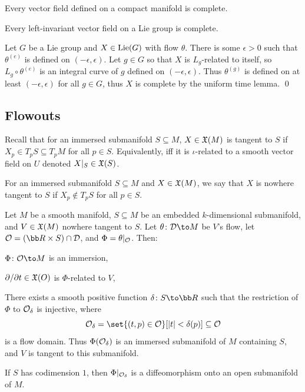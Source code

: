 \eproof

\bcoro

    Every vector field defined on a compact manifold is complete.

\ecoro

\bthrm

    Every left-invariant vector field on a Lie group is complete.

\ethrm

\bproof

    Let $G$ be a Lie group and $X\in{\rm Lie}(G)$ with flow $\theta$.
    There is some $\epsilon>0$ such that $\theta^{(e)}$ is defined on $(-\epsilon,\epsilon)$.
    Let $g\in G$ so that $X$ is $L_g$-related to itself, so $L_g\circ\theta^{(e)}$ is an integral curve of $g$ defined on $(-\epsilon,\epsilon)$.
    Thus $\theta^{(g)}$ is defined on at least $(-\epsilon,\epsilon)$ for all $g\in G$, thus $X$ is complete by the uniform time lemma.
    \qed

\eproof

\subsection{Flowouts}

Recall that for an immersed submanifold $S\subseteq M$, $X\in{\frak X}(M)$ is {\emphcolor tangent to $S$} if $X_p\in T_pS\subseteq T_pM$ for all $p\in S$.
Equivalently, iff it is $\iota$-related to a smooth vector field on $U$ denoted $X|_S\in{\frak X}(S)$.

\bdefn

    For an immersed submanifold $S\subseteq M$ and $X\in{\frak X}(M)$, we say that $X$ is {\emphcolor nowhere tangent to $S$} if
    $X_p\notin T_pS$ for all $p\in S$.

\edefn

\bthrm[title=Flowout theorem]

    Let $M$ be a smooth manifold, $S\subseteq M$ be an embedded $k$-dimensional submanifold, and $V\in{\frak X}(M)$ nowhere tangent to $S$.
    Let $\theta\colon\D\to M$ be $V$'s flow, let $\O=(\bR\times S)\cap\D$, and $\Phi=\theta|_{{\cal O}}$.
    Then:
    \benum
        \item $\Phi\colon\O\to M$ is an immersion,
        \item $\partial /\partial t\in{\frak X}(O)$ is $\Phi$-related to $V$,
        \item There exists a smooth positive function $\delta\colon S\to\bR$ such that the restriction of $\Phi$ to ${{\cal O}}_\delta$ is injective, where
        $$ \O_\delta = \set{(t,p)\in\O}[\abs t<\delta(p)] \subseteq \O $$
        is a flow domain.
        Thus $\Phi({{\cal O}}_\delta)$ is an immersed submanifold of $M$ containing $S$, and $V$ is tangent to this submanifold.
        \item If $S$ has codimension $1$, then $\Phi|_{{{\cal O}}_\delta}$ is a diffeomorphism onto an open submanifold of $M$.
    \eenum

